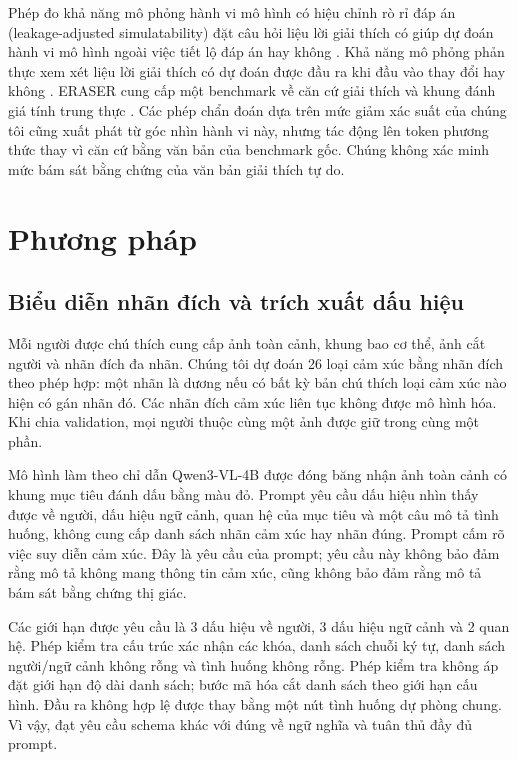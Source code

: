 \documentclass[conference]{IEEEtran}
\newcommand{\ev}[2]{#2}
\begin{document}
Phép đo khả năng mô phỏng hành vi mô hình có hiệu chỉnh rò rỉ đáp án (leakage-adjusted simulatability) đặt câu hỏi liệu lời giải thích có giúp dự đoán hành vi mô hình ngoài việc tiết lộ đáp án hay không \cite{simulatability}. Khả năng mô phỏng phản thực xem xét liệu lời giải thích có dự đoán được đầu ra khi đầu vào thay đổi hay không \cite{counterfactual}. ERASER cung cấp một benchmark về căn cứ giải thích và khung đánh giá tính trung thực \cite{eraser}. Các phép chẩn đoán dựa trên mức giảm xác suất của chúng tôi cũng xuất phát từ góc nhìn hành vi này, nhưng tác động lên token phương thức thay vì căn cứ bằng văn bản của benchmark gốc. Chúng không xác minh mức bám sát bằng chứng của văn bản giải thích tự do.

\section{Phương pháp}\label{sec:method}
\subsection{Biểu diễn nhãn đích và trích xuất dấu hiệu}
Mỗi người được chú thích cung cấp ảnh toàn cảnh, khung bao cơ thể, ảnh cắt người và nhãn đích đa nhãn. Chúng tôi dự đoán \ev{labels}{26} loại cảm xúc bằng nhãn đích theo phép hợp: một nhãn là dương nếu có bất kỳ bản chú thích loại cảm xúc nào hiện có gán nhãn đó. Các nhãn đích cảm xúc liên tục không được mô hình hóa. Khi chia validation, mọi người thuộc cùng một ảnh được giữ trong cùng một phần.

Mô hình làm theo chỉ dẫn \ev{qwen}{Qwen3-VL-4B} được đóng băng nhận ảnh toàn cảnh có khung mục tiêu đánh dấu bằng màu đỏ. Prompt yêu cầu dấu hiệu nhìn thấy được về người, dấu hiệu ngữ cảnh, quan hệ của mục tiêu và một câu mô tả tình huống, không cung cấp danh sách nhãn cảm xúc hay nhãn đúng. Prompt cấm rõ việc suy diễn cảm xúc. Đây là yêu cầu của prompt; yêu cầu này không bảo đảm rằng mô tả không mang thông tin cảm xúc, cũng không bảo đảm rằng mô tả bám sát bằng chứng thị giác.

Các giới hạn được yêu cầu là \ev{max-person-cues}{3} dấu hiệu về người, \ev{max-context-cues}{3} dấu hiệu ngữ cảnh và \ev{max-relations}{2} quan hệ. Phép kiểm tra cấu trúc xác nhận các khóa, danh sách chuỗi ký tự, danh sách người/ngữ cảnh không rỗng và tình huống không rỗng. Phép kiểm tra không áp đặt giới hạn độ dài danh sách; bước mã hóa cắt danh sách theo giới hạn cấu hình. Đầu ra không hợp lệ được thay bằng một nút tình huống dự phòng chung. Vì vậy, đạt yêu cầu schema khác với đúng về ngữ nghĩa và tuân thủ đầy đủ prompt.
\end{document}
